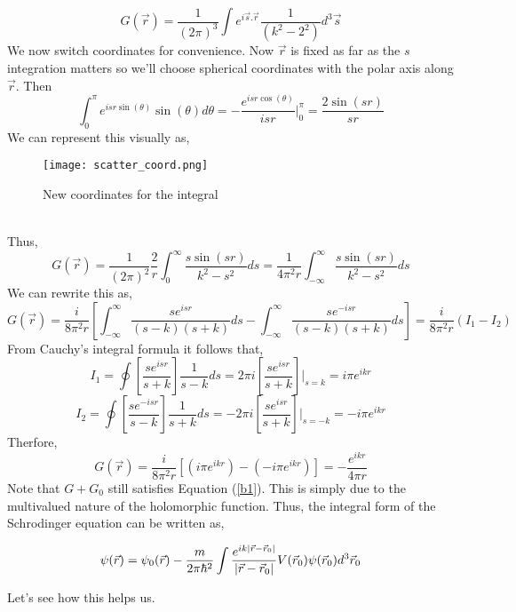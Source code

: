$$G(\vec{r}) = \frac{1}{{(2 \pi)}^{3}}  \int e^{i \vec{s}. \vec{r}} \frac{1}{(k^{2} - 2^{2})} d^{3}\vec{s}$$
We now switch coordinates for convenience. Now $\vec{r}$ is fixed as far as the $s$ integration matters so we'll choose spherical coordinates with the polar axis along $\vec{r}$. Then 
$$\int^{ \pi}_{0} e^{isr \sin(\theta)} \sin(\theta) d \theta = - \frac{e^{isr \cos(\theta)}}{isr} \Big \rvert^{\pi}_{0} = \frac{2 \sin(sr)}{sr}$$
We can represent this visually as,
\begin{figure}[h]
	\centering
	\texttt{[image: scatter\_coord.png]}
	\caption{New coordinates for the integral}
\end{figure}
\\
Thus,
$$G(\vec{r}) =  \frac{1}{{(2 \pi)}^{2}}\frac{2}{r} \int^{\infty}_{0} \frac{s \sin(sr)}{k^{2} - s^{2}} ds = \frac{1}{4 \pi^{2} r}\int^{\infty}_{-\infty} \frac{s \sin(sr)}{k^{2} - s^{2}} ds$$
We can rewrite this as,
$$G(\vec{r}) = \frac{i}{8 \pi^{2} r} \left[\int_{-\infty}^{\infty} \frac{se^{isr}}{(s-k)(s+k)} ds - \int_{-\infty}^{\infty} \frac{se^{-isr}}{(s-k)(s+k)} ds \right] = \frac{i}{8 \pi^{2} r}(I_{1}-I_{2})$$
From Cauchy's integral formula it follows that,
$$I_{1} = \oint \left[\frac{se^{isr}}{s + k} \right] \frac{1}{s-k}ds = 2 \pi i \left[ \frac{s e^{isr}}{s + k} \right] \Big \rvert_{{s= k}}  = i \pi e^{ikr}$$
$$I_{2} = \oint \left[\frac{se^{-isr}}{s - k} \right] \frac{1}{s+k}ds = -2 \pi i \left[ \frac{s e^{isr}}{s + k} \right] \Big \rvert_{{s= -k}}  = -i \pi e^{ikr}$$
Therfore,
\begin{equation} \label{b1}
G(\vec{r}) = \frac{i}{8 \pi^{2} r} \left[ \left(i \pi e^{ikr} \right) - \left(-i \pi e^{ikr} \right) \right] = -\frac{e^{ikr}}{4 \pi r}
\end{equation}
Note that $G + G_{0}$ still satisfies Equation (\ref{b1}). This is simply due to the multivalued nature of the holomorphic function. Thus, the integral form of the Schrodinger equation can be written as,
\begin{tcolorbox}
\begin{equation}
\psi(\vec{r}) = \psi_{0}(\vec{r}) - \frac{m}{2 \pi \hbar^{2}}\int\frac{e^{ik\abs{\vec{r} - \vec{r}_{0}}}}{\abs{\vec{r} - \vec{r}_{0}}}  V(\vec{r}_{0}) \psi(\vec{r}_{0}) d^{3}\vec{r}_{0}
\end{equation}
\end{tcolorbox}
Let's see how this helps us.
